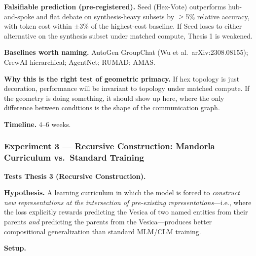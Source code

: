 \documentclass[11pt,a4paper]{article}
\begin{document}
\textbf{Falsifiable prediction (pre-registered).} Seed (Hex-Vote) outperforms hub-and-spoke and flat debate on synthesis-heavy subsets by $\geq$5\% relative accuracy, with token cost within $\pm$3\% of the highest-cost baseline. If Seed loses to either alternative on the synthesis subset under matched compute, Thesis 1 is weakened.

\textbf{Baselines worth naming.} AutoGen GroupChat (Wu et al.\ arXiv:2308.08155); CrewAI hierarchical; AgentNet; RUMAD; AMAS.

\textbf{Why this is the right test of geometric primacy.} If hex topology is just decoration, performance will be invariant to topology under matched compute. If the geometry is doing something, it should show up here, where the only difference between conditions is the shape of the communication graph.

\textbf{Timeline.} 4--6 weeks.

\subsubsection*{Experiment 3 --- Recursive Construction: Mandorla Curriculum vs.\ Standard Training}

\textbf{Tests Thesis 3 (Recursive Construction).}

\textbf{Hypothesis.} A learning curriculum in which the model is forced to \emph{construct new representations at the intersection of pre-existing representations}---i.e., where the loss explicitly rewards predicting the Vesica of two named entities from their parents \emph{and} predicting the parents from the Vesica---produces better compositional generalization than standard MLM/CLM training.

\textbf{Setup.}
\end{document}
